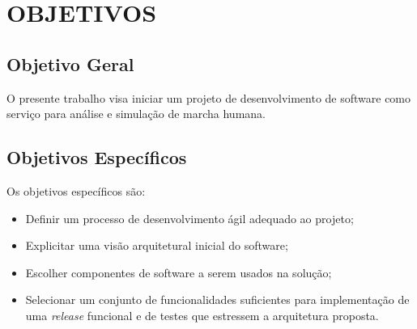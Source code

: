 \section[OBJETIVOS]{OBJETIVOS}

\subsection[Objetivo Geral]{\textbf{Objetivo Geral}}
O presente trabalho visa iniciar um projeto de desenvolvimento de software como serviço para análise e simulação de marcha humana.

\subsection[Objetivo Específicos]{\textbf{Objetivos Específicos}}
Os objetivos específicos são:
\begin{itemize}
	\item Definir um processo de desenvolvimento ágil adequado ao projeto;
	\item Explicitar uma visão arquitetural inicial do software;
	\item Escolher componentes de software a serem usados na solução;
	\item Selecionar um conjunto de funcionalidades suficientes para implementação de uma \emph{release} funcional e de testes que estressem a arquitetura proposta.
\end{itemize}
